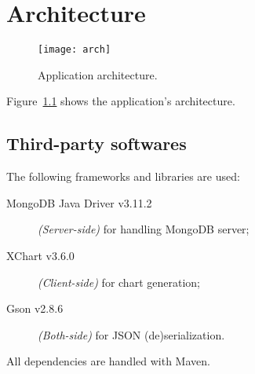 \chapter{Architecture}\label{ch:arch}

\begin{figure}[p]
	\texttt{[image: arch]}
	\caption{Application architecture.}
	\label{fig:arch}
\end{figure}

Figure~\ref{fig:arch} shows the application's architecture.

\section{Third-party softwares}\label{sec:thirdparty}

The following frameworks and libraries are used:
\begin{description}
	\item[MongoDB Java Driver v3.11.2] \textit{(Server-side)} for handling
		MongoDB server;
	\item[XChart v3.6.0] \textit{(Client-side)} for chart generation;
	\item[Gson v2.8.6] \textit{(Both-side)} for JSON (de)serialization.
\end{description}

All dependencies are handled with Maven.
